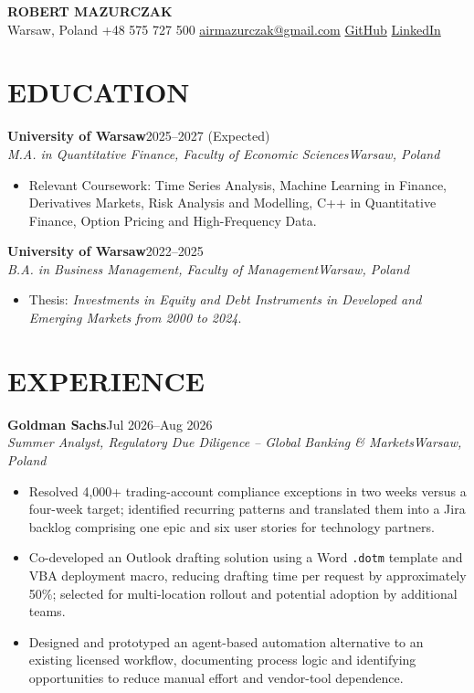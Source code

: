 \documentclass[10pt,a4paper]{article}
\newcommand{\entry}[4]{%
  \textbf{#1}\hfill #2\\[-1pt]
  \textit{#3}\hfill \textit{#4}\vspace{-2pt}
}
\begin{document}
\small

\begin{center}
  {\LARGE\bfseries ROBERT MAZURCZAK}\\[2pt]
  Warsaw, Poland \textbar{} +48 575 727 500 \textbar{}
  \href{mailto:airmazurczak@gmail.com}{airmazurczak@gmail.com} \textbar{}
  \href{https://github.com/cliprob}{GitHub} \textbar{}
  \href{https://www.linkedin.com/in/robert-mazurczak-206a12209}{LinkedIn}
\end{center}
\vspace{-7pt}

\section{EDUCATION}
\entry{University of Warsaw}{2025--2027 (Expected)}{M.A. in Quantitative Finance, Faculty of Economic Sciences}{Warsaw, Poland}
\begin{itemize}
  \item Relevant Coursework: Time Series Analysis, Machine Learning in Finance, Derivatives Markets, Risk Analysis and Modelling, C++ in Quantitative Finance, Option Pricing and High-Frequency Data.
\end{itemize}

\entry{University of Warsaw}{2022--2025}{B.A. in Business Management, Faculty of Management}{Warsaw, Poland}
\begin{itemize}
  \item Thesis: \textit{Investments in Equity and Debt Instruments in Developed and Emerging Markets from 2000 to 2024}.
\end{itemize}

\section{EXPERIENCE}
\entry{Goldman Sachs}{Jul 2026--Aug 2026}{Summer Analyst, Regulatory Due Diligence -- Global Banking \& Markets}{Warsaw, Poland}
\begin{itemize}
  \item Resolved 4,000+ trading-account compliance exceptions in two weeks versus a four-week target; identified recurring patterns and translated them into a Jira backlog comprising one epic and six user stories for technology partners.
  \item Co-developed an Outlook drafting solution using a Word \texttt{.dotm} template and VBA deployment macro, reducing drafting time per request by approximately 50\%; selected for multi-location rollout and potential adoption by additional teams.
  \item Designed and prototyped an agent-based automation alternative to an existing licensed workflow, documenting process logic and identifying opportunities to reduce manual effort and vendor-tool dependence.
\end{itemize}
\end{document}
